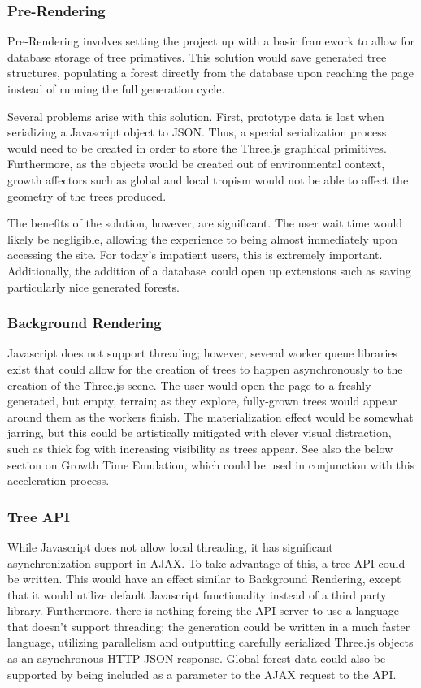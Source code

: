 \documentclass{article}
\newcommand{\tab}{\hspace*{2em}}
\begin{document}
            \subsubsection{Pre-Rendering}
    \tab Pre-Rendering involves setting the project up with a basic framework to allow for database
storage of tree primatives. This solution would save generated tree structures, populating a forest
directly from the database upon reaching the page instead of running the full generation cycle.

    \tab Several problems arise with this solution. First, prototype data is lost when serializing a
Javascript object to JSON. Thus, a special serialization process would need to be created in order
to store the Three.js graphical primitives. Furthermore, as the objects would be created out of
environmental context, growth affectors such as global and local tropism would not be able to
affect the geometry of the trees produced.

    \tab The benefits of the solution, however, are significant. The user wait time would likely be
negligible, allowing the experience to being almost immediately upon accessing the site. For
today's impatient users, this is extremely important. Additionally, the addition of a database\
could open up extensions such as saving particularly nice generated forests.

            \subsubsection{Background Rendering}
    \tab Javascript does not support threading; however, several worker queue libraries exist that
could allow for the creation of trees to happen asynchronously to the creation of the Three.js
scene. The user would open the page to a freshly generated, but empty, terrain; as they explore,
fully-grown trees would appear around them as the workers finish. The materialization effect would be
somewhat jarring, but this could be artistically mitigated with clever visual distraction, such as
thick fog with increasing visibility as trees appear. See also the below section on Growth Time
Emulation, which could be used in conjunction with this acceleration process.

            \subsubsection{Tree API}
    \tab While Javascript does not allow local threading, it has significant asynchronization
support in AJAX. To take advantage of this, a tree API could be written. This would have an effect
similar to Background Rendering, except that it would utilize default Javascript functionality
instead of a third party library. 
Furthermore, there is nothing forcing the API server to use a language that doesn't support
threading; the generation could be written in a much faster language, utilizing parallelism and 
outputting carefully
serialized Three.js objects as an asynchronous HTTP JSON response. Global forest data could also be
supported by being included as a parameter to the AJAX request to the API.
\end{document}
